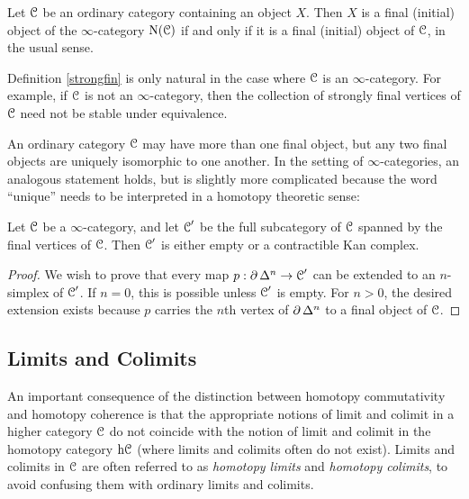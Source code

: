 \begin{Didn't Read}
\begin{example}
Let $\operatorname{\mathcal{C}}$ be an ordinary category containing an object $X$. Then $X$ is a final (initial)
object of the $\infty$-category $\operatorname{N}(\operatorname{\mathcal{C}})$ if and only if it is a final (initial) object of $\operatorname{\mathcal{C}}$, in the usual sense.
\end{example}

\begin{remark}
Definition \ref{strongfin} is only natural in the case where $\operatorname{\mathcal{C}}$ is an $\infty$-category. For example, if $\operatorname{\mathcal{C}}$ is not an $\infty$-category, then the collection of strongly final vertices of $\operatorname{\mathcal{C}}$ need not be stable under equivalence.
\end{remark}

An ordinary category $\operatorname{\mathcal{C}}$ may have more than one final object,
but any two final objects are uniquely isomorphic to one another.
In the setting of $\infty$-categories, an analogous statement holds,
but is slightly more complicated because the word ``unique'' needs to be
interpreted in a homotopy theoretic sense:

\begin{proposition}[Joyal]\label{initunique}
Let $\operatorname{\mathcal{C}}$ be a $\infty$-category, and let $\operatorname{\mathcal{C}}'$ be the full subcategory
of $\operatorname{\mathcal{C}}$ spanned by the final vertices of $\operatorname{\mathcal{C}}$. Then $\operatorname{\mathcal{C}}'$ is either empty or
a contractible Kan complex.
\end{proposition}

\begin{proof}
We wish to prove that every map $p: \operatorname{\partial} \Delta^n \rightarrow \operatorname{\mathcal{C}}'$
can be extended to an $n$-simplex of $\operatorname{\mathcal{C}}'$. If $n = 0$, this is
possible unless $\operatorname{\mathcal{C}}'$ is empty. For $n > 0$, the desired extension exists
because $p$ carries the $n$th vertex of $\operatorname{\partial} \Delta^n$ to a final
object of $\operatorname{\mathcal{C}}$.
\end{proof}

\subsection{Limits and Colimits}\label{limitcolimit}

An important consequence of the distinction between homotopy
commutativity and homotopy coherence is that the appropriate
notions of limit and colimit in a higher category
$\operatorname{\mathcal{C}}$ do not coincide with the notion of limit and colimit in the homotopy category $\rm{h} \it{\operatorname{\mathcal{C}}}$ (where limits and colimits often do
not exist). Limits and colimits in
$\operatorname{\mathcal{C}}$ are often referred to as {\it homotopy limits} and
{\it homotopy colimits}, to avoid confusing them with ordinary limits
and colimits.


\end{Didn't Read}

